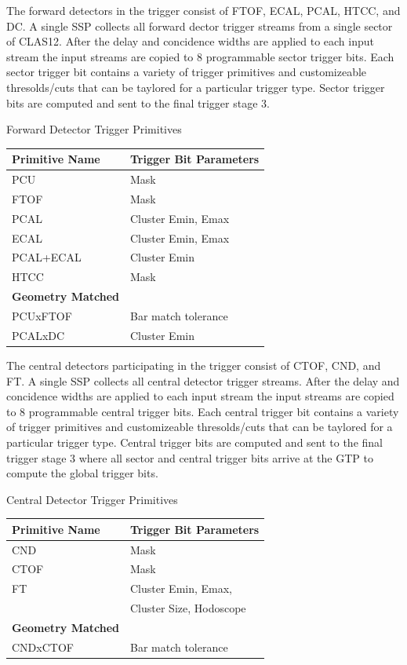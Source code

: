 The forward detectors in the trigger consist of FTOF, ECAL, PCAL, HTCC, and DC. A single SSP collects all forward dector trigger streams from a single sector of CLAS12. After the delay and concidence widths are applied to each input stream the input streams are copied to 8 programmable sector trigger bits. Each sector trigger bit contains a variety of trigger primitives and customizeable thresolds/cuts that can be taylored for a particular trigger type. Sector trigger bits are computed and sent to the final trigger stage 3.

\begin{center}
	Forward Detector Trigger Primitives\\
	\begin{tabular}{| l | l |}
		\hline \hline
		Primitive Name			& Trigger Bit Parameters	\\
		\hline
		PCU     			& Mask				\\
		FTOF    			& Mask				\\
		PCAL				& Cluster Emin, Emax		\\
		ECAL				& Cluster Emin, Emax		\\
		PCAL+ECAL			& Cluster Emin			\\
		HTCC				& Mask				\\
		{\bf Geometry Matched}		&				\\
		PCUxFTOF			& Bar match tolerance		\\
		PCALxDC				& Cluster Emin			\\
		\hline \hline
	\end{tabular}
\end{center}

The central detectors participating in the trigger consist of CTOF, CND, and FT. A single SSP collects all central detector trigger streams. After the delay and concidence widths are applied to each input stream the input streams are copied to 8 programmable central trigger bits. Each central trigger bit contains a variety of trigger primitives and customizeable thresolds/cuts that can be taylored for a particular trigger type. Central trigger bits are computed and sent to the final trigger stage 3 where all sector and central trigger bits arrive at the GTP to compute the global trigger bits.

\begin{center}
	Central Detector Trigger Primitives\\
	\begin{tabular}{| l | l |}
		\hline \hline
		Primitive Name			& Trigger Bit Parameters	\\
		\hline
		CND     			& Mask				\\
		CTOF    			& Mask				\\
		FT				& Cluster Emin, Emax, 		\\
						& Cluster Size, Hodoscope	\\
		{\bf Geometry Matched}		&				\\
		CNDxCTOF			& Bar match tolerance		\\
		\hline \hline
	\end{tabular}
\end{center}


